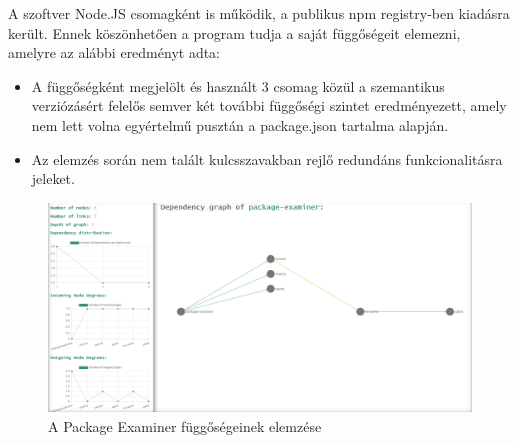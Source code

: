 
A szoftver Node.JS csomagként is működik, a publikus npm registry-ben kiadásra került. Ennek köszönhetően a program tudja a saját függőségeit elemezni, amelyre az alábbi eredményt adta:

\begin{itemize}
	\item A függőségként megjelölt és használt 3 csomag közül a szemantikus verziózásért felelős semver két további függőségi szintet eredményezett, amely nem lett volna egyértelmű pusztán a package.json tartalma alapján.
	\item Az elemzés során nem talált kulcsszavakban rejlő redundáns funkcionalitásra jeleket.
\end{itemize}

\begin{figure}[!h]
	\centering
	\includegraphics[scale=0.25]{images/package-examiner.png}
	\caption{A Package Examiner függőségeinek elemzése}
	\label{fig:package-examiner}
\end{figure}
